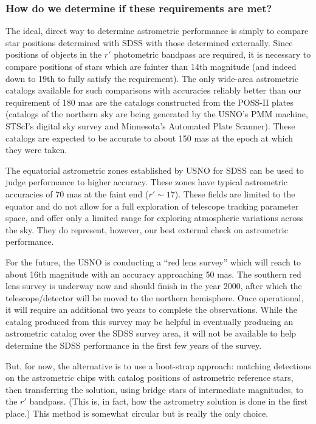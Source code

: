 \subsubsection{How do we determine if these requirements are met?}
The ideal, direct way to determine astrometric performance is simply to
compare star positions determined with SDSS with those determined
externally.  Since positions of objects in the $r'$ photometric bandpass
are required, it is necessary to compare positions of stars which
are fainter than 14th magnitude (and indeed down to
19th to fully satisfy the requirement).  The only wide-area astrometric
catalogs available for such comparisons with accuracies reliably better
than our requirement of 180 mas are the catalogs constructed from the
POSS-II plates (catalogs of the northern sky are being generated by the
USNO's PMM machine, STScI's digital sky survey and Minnesota's Automated
Plate Scanner).  These catalogs are expected to be accurate to 
about 150 mas at the epoch at which they were taken.

The equatorial
astrometric zones established by USNO for SDSS can be used to judge
performance to higher accuracy.  These 
zones have typical astrometric accuracies of 70 mas at the faint
end ($r' \sim 17 $).  These fields are limited to the equator and
do not allow for a full exploration of telescope tracking parameter
space, and offer only a limited range for exploring atmospheric
variations across the sky.  They do represent, however, our best
external check on astrometric performance.

For the future, the USNO is conducting a ``red lens survey''
which will reach to about 16th magnitude with an accuracy approaching
50 mas.  The southern red lens survey is underway now and should finish
in the year 2000, after which the telescope/detector will be moved to
the northern hemisphere.  Once operational, it  will require an additional
two years to complete the observations.  While the catalog produced
from this survey may be helpful in eventually producing an astrometric
catalog over the SDSS survey area, it will not be available to help
determine the SDSS performance in the first few years of the survey.

But, for now, the alternative is to use a boot-strap approach:
matching detections on the astrometric chips with catalog positions of
astrometric reference stars, then transferring the solution, using bridge 
stars of intermediate magnitudes, to the $r'$ bandpass.
(This is, in fact, how the astrometry solution is done in the first
place.)  This method is somewhat circular but is really the
only choice.


